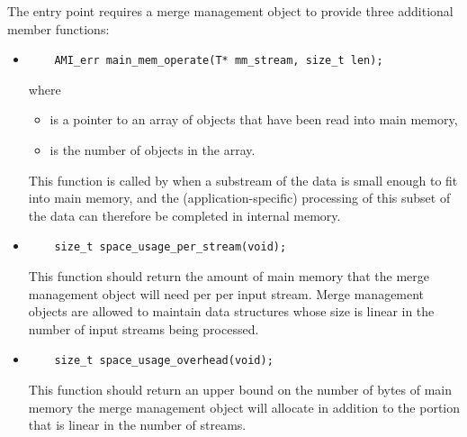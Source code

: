 
The  entry point 
requires a merge management object to provide three
additional member functions:

\begin{itemize}
    \item {}
\begin{verbatim}
    AMI_err main_mem_operate(T* mm_stream, size_t len);
\end{verbatim}
\noindent
where
    \begin{itemize}
        \item {} is a pointer to an array
        of objects that have been read into main memory,
        \item {} is the number of objects in the
        array.
    \end{itemize}
    
    This function is called by
     when a substream of
    the data is small enough to fit into main memory, and
    the (application-specific) processing of this subset of
    the data can therefore be completed in internal memory.

    
    \item {}
\begin{verbatim}
    size_t space_usage_per_stream(void);
\end{verbatim}
    This function should return the amount of main memory
    that the merge management object will need per per input
    stream. Merge management objects are allowed to maintain
    data structures whose size is linear in the number of
    input streams being processed.

    \item {}
\begin{verbatim}
    size_t space_usage_overhead(void);
\end{verbatim}
    This function should return an upper bound on the number
    of bytes of main memory
    the merge management object will allocate in addition to
    the portion that is linear in the number of streams.
    
\end{itemize}


